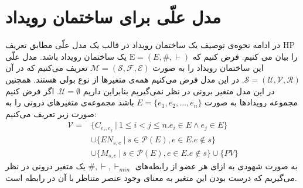 \documentclass[
msc,
irfonts
]{./tex/tehran-thesis}
\newcommand{\پ}{پروژه/پایان‌نامه/رساله }
\theoremstyle{definition}
\theoremstyle{theorem}
\theoremstyle{definition}
\numberwithin{algorithm}{chapter}
\newcommand{\s}[1]{\{#1\}}
\newcommand{\e}{\emptyset}
\newcommand{\mc}[1]{\mathcal{#1}}
\newcommand{\mr}[1]{\mathrm{#1}}
\begin{document}
\section{مدل علّی برای ساختمان رویداد}
\label{es-causal-model}
در ادامه نحوه‌ی توصیف یک ساختمان رویداد در قالب یک مدل علّی مطابق تعریف 
HP
را بیان می کنیم.
فرض کنیم که
$\mr{E} = (E,\#,\vdash)$
یک ساختمان رویداد باشد.
مدل علّی این ساختمان رویداد را به صورت
$\mc{M} = (\mc{S},\mc{F},\mc{E})$
تعریف می‌کنیم که در آن
$\mc{S} = (\mc{U},\mc{V},\mc{R})$.
در این مدل فرض می‌کنیم همه‌ی متغیر‌ها از نوع بولی هستند.
همچنین در این مدل متغیر برونی در نظر نمی‌گیریم بنابراین داریم
$\mc{U} = \e$.
اگر فرض کنیم مجموعه‌ رویدادها به صورت
$E = \s{e_1,e_2,...,e_n}$
باشد مجموعه‌ی متغیر‌های درونی را به صورت زیر تعریف می‌کنیم:
\begin{align*}
    \mathcal{V} = & \s{C_{e_i,e_j} ~|~  1 \leq i < j \leq n.
    e_i \in E \wedge e_j \in E}                              \\
                  & \cup \s{EN_{s,e} ~|~ s \in \mathcal{P}(E),
    e \in E. e \not \in s }                                  \\
                  & \cup \s{M_{s,e} ~|~ s \in \mathcal{P}(E),
        e \in E. e \not \in s } \cup \s{PV}
\end{align*}
به صورت شهودی به ازای هر عضو از رابطه‌های
$\#,\vdash,\vdash_{min}$
یک متغیر درونی در نظر می‌گیریم که درست بودن این متغیر به معنای وجود عنصر متناظر با آن در رابطه است.
\end{document}
